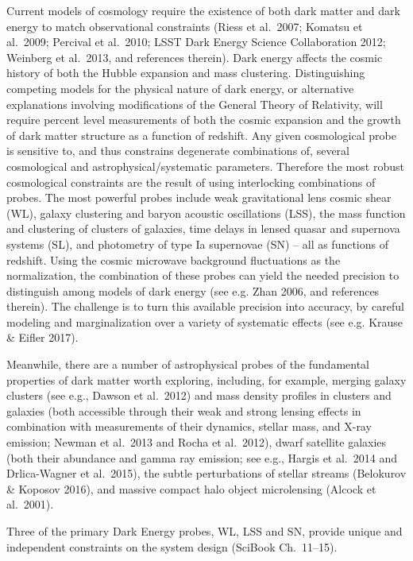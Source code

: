 Current models of cosmology require the existence of both dark matter and dark
energy to match observational constraints (Riess et al.~2007; Komatsu et al.~2009;
Percival et al.~2010; LSST Dark Energy Science Collaboration 2012; Weinberg et al.~2013, and
references therein). Dark energy affects the cosmic history of both the Hubble expansion
and mass clustering. Distinguishing competing models for the physical
nature of dark energy, or alternative explanations involving
modifications of the General Theory of Relativity, will require
percent level measurements of both the cosmic expansion and the growth
of dark matter structure as a function of redshift.  Any given
cosmological probe is sensitive to, and thus constrains degenerate
combinations of, several cosmological and astrophysical/systematic parameters.  Therefore the most robust
cosmological constraints are the result of using interlocking combinations
of probes. The most powerful probes include weak gravitational lens cosmic shear (WL), galaxy clustering and baryon
acoustic oscillations (LSS), the mass function and clustering of clusters of galaxies,
time delays in lensed quasar and supernova systems (SL),
and photometry of type Ia supernovae (SN) -- all as functions of
redshift. Using the cosmic microwave background fluctuations as the normalization, the
combination of these probes can yield the needed precision to distinguish among models of dark
energy (see e.g. Zhan 2006, and references therein). The challenge is to turn this available precision into accuracy, by careful modeling and marginalization over a variety of systematic effects (see e.g. Krause \& Eifler 2017).

Meanwhile, there are a number of astrophysical probes of the fundamental
properties of dark matter worth exploring, including, for example, merging
galaxy clusters (see e.g., Dawson et al.~2012) and mass density profiles in
clusters and galaxies (both accessible through their weak and strong lensing
effects in combination with measurements of their dynamics, stellar mass, and
X-ray emission; Newman et al.~2013 and Rocha et al.~2012), dwarf satellite
galaxies (both their abundance and gamma ray emission; see e.g., Hargis et
al.~2014 and Drlica-Wagner et al.~2015),  the subtle perturbations of stellar
streams (Belokurov \& Koposov 2016), and massive compact halo object
microlensing (Alcock et al.~2001).

Three of the primary Dark Energy probes, WL, LSS and SN,  provide unique and
independent constraints on the system design (SciBook Ch.~11--15).

